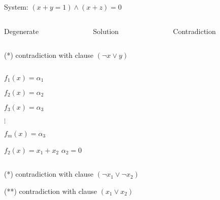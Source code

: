 \begin{frame}

    System: $(x + y = 1) \land (x + z) = 0$
	\begin{columns}
        \begin{column}{3cm}
            Degenerate
        \end{column}
        \begin{column}{3cm}
            Solution
    \end{column}
        \begin{column}{3cm}
            Contradiction
        \end{column}
    \end{columns}

    
    \begin{columns}
        \begin{column}{3cm}
            
        \end{column}
        \begin{column}{3cm}
            
        \end{column}
        \begin{column}{3cm}
            
        \end{column}
    \end{columns}

    \vspace{2cm}
    \alert{(*)} contradiction with clause $(\neg x \lor y)$

\end{frame}


\begin{frame}

    \begin{columns}
        \begin{column}{2.5cm}
            $f_1(x) = \alpha_1$

            $f_2(x) = \alpha_2$

            $f_3(x) = \alpha_3$

            $\vdots$

            $f_m(x) = \alpha_3$

            \vspace{1.5cm}

            $f_2(x) = x_1 + x_2$
            $\alpha_2 = 0$
        \end{column}
        \begin{column}{7cm}
            
	    \end{column}
    \end{columns}

    \alert{(*)} contradiction with clause $(\neg x_1 \lor \neg x_2)$

    \alert{(**)} contradiction with clause $(x_1 \lor x_2)$
\end{frame}
